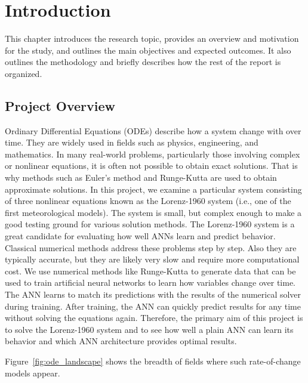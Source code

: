 \chapter{Introduction}

This chapter introduces the research topic, provides an overview and motivation for the study, and outlines the main objectives and expected outcomes. It also outlines the methodology and briefly describes how the rest of the report is organized.

\section{Project Overview}
Ordinary Differential Equations (ODEs) describe how a system change with over time. They are widely used in fields such as physics, engineering, and mathematics. In many 
real-world problems, particularly those involving complex or nonlinear equations, it is often 
not possible to obtain exact solutions. That is why methods such as Euler’s method and 
Runge-Kutta are used to obtain approximate solutions. In this project, we examine a 
particular system consisting of three nonlinear equations known as the Lorenz-1960 system 
(i.e., one of the first meteorological models). The system is small, but complex enough to 
make a good testing ground for various solution methods. The Lorenz-1960 system is a 
great candidate for evaluating how well ANNs learn and predict behavior. Classical 
numerical methods address these problems step by step. Also they are typically accurate, but 
they are likely very slow and require more computational cost. We use numerical methods like Runge-Kutta to generate data that can be used to train artificial neural networks to learn how variables change over time.
The ANN learns to match its predictions with the results of the numerical solver during training. After training, the ANN can quickly predict results for any time without solving the equations again.
Therefore, the primary aim  of this project is to solve the Lorenz-1960 system 
and to see how well a plain ANN can learn its behavior and which ANN architecture provides
optimal results. 


Figure~\ref{fig:ode_landscape} shows the breadth of fields where such rate-of-change models appear.

